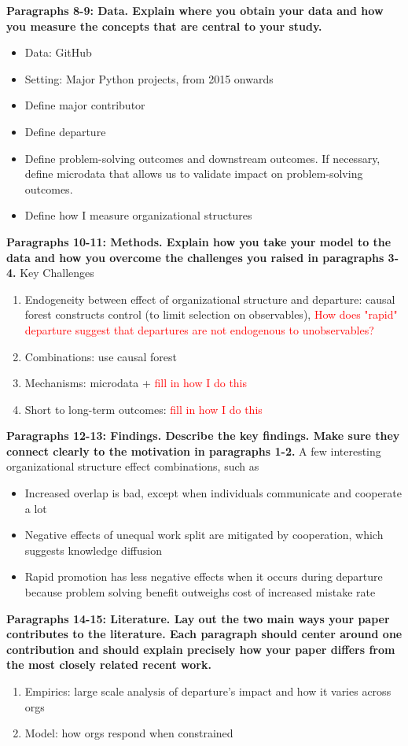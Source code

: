 \documentclass[source/paper/main.tex]{subfiles}
\begin{document}
\textbf{Paragraphs 8-9: Data. Explain where you obtain your data and how you measure the concepts that are central to your study.}

\begin{itemize}
    \item Data: GitHub
    \item Setting: Major Python projects, from 2015 onwards
    \item Define major contributor
    \item Define departure
    \item Define problem-solving outcomes and downstream outcomes. If necessary, define microdata that allows us to validate impact on problem-solving outcomes. 
    \item Define how I measure organizational structures
\end{itemize}

\textbf{Paragraphs 10-11: Methods. Explain how you take your model to the data and how you overcome the challenges you raised in paragraphs 3-4.}
Key Challenges
\begin{enumerate}
    \item Endogeneity between effect of organizational structure and departure: causal forest constructs control (to limit selection on observables), \textcolor{red}{How does "rapid" departure suggest that departures are not endogenous to unobservables? } 
    \item Combinations: use causal forest
    \item Mechanisms: microdata + \textcolor{red}{fill in how I do this}
    \item Short to long-term outcomes: \textcolor{red}{fill in how I do this}
\end{enumerate}

\textbf{Paragraphs 12-13: Findings. Describe the key findings. Make sure they connect clearly to the motivation in paragraphs 1-2.}
A few interesting organizational structure effect combinations, such as
\begin{itemize}
    \item Increased overlap is bad, except when individuals communicate and cooperate a lot
    \item Negative effects of unequal work split are mitigated by cooperation, which suggests knowledge diffusion
    \item Rapid promotion has less negative effects when it occurs during departure because problem solving benefit outweighs cost of increased mistake rate
\end{itemize}

\textbf{Paragraphs 14-15: Literature. Lay out the two main ways your paper contributes to the literature. Each paragraph should center around one contribution and should explain precisely how your paper differs from the most closely related recent work.}

\begin{enumerate}
    \item Empirics: large scale analysis of departure's impact and how it varies across orgs
    \item Model: how orgs respond when constrained
\end{enumerate}
\end{document}

